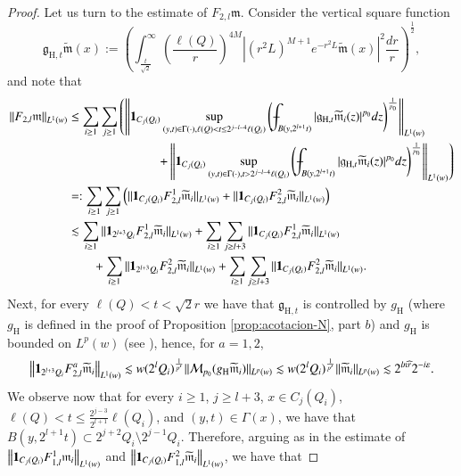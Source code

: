\documentclass[11pt, a4paper,leqno]{amsart}
\newcommand{\mm}{\mathfrak{m}}
\def\Xint#1{\mathchoice
    {\XXint\displaystyle\textstyle{#1}}%
    {\XXint\textstyle\scriptstyle{#1}}%
    {\XXint\scriptstyle\scriptscriptstyle{#1}}%
    {\XXint\scriptscriptstyle\scriptscriptstyle{#1}}%
    \!\int}
\def\XXint#1#2#3{{\setbox0=\hbox{$#1{#2#3}{\int}$}
    \vcenter{\hbox{$#2#3$}}\kern-.5\wd0}}
\def\dashint{\Xint-}
\def\Xint#1{\mathchoice
    {\XXint\displaystyle\textstyle{#1}}%
    {\XXint\textstyle\scriptstyle{#1}}%
    {\XXint\scriptstyle\scriptscriptstyle{#1}}%
    {\XXint\scriptscriptstyle\scriptscriptstyle{#1}}%
    \!\int}
\def\XXint#1#2#3{{\setbox0=\hbox{$#1{#2#3}{\int}$}
    \vcenter{\hbox{$#2#3$}}\kern-.5\wd0}}
\renewcommand{\chi}{{\bf 1}}
\theoremstyle{plain}
\theoremstyle{definition}
\theoremstyle{remark}
\numberwithin{equation}{section}
\def \hh{ \mathrm{H} }
\begin{document}
\begin{proof}
Let us turn to the estimate of $F_{2,l}\mm$.
Consider the vertical square function
$$
\mathfrak{g}_{\hh,t}\widetilde{\mm}(x):=\left(\int_{\frac{t}{\sqrt{2}}}^{\infty}\left(\frac{\ell(Q)}{r}\right)^{4M}|(r^2L)^{M+1}e^{-r^2L}\widetilde{\mm}(x)|^2\frac{dr}{r}\right)^{\frac{1}{2}},
$$
and note that
\begin{align}\label{F2lP}
\|F_{2,l}\mm\|_{L^1(w)}&\leq \sum_{i\geq 1}\sum_{j\geq 1}\left(\left\|\chi_{C_j(Q_i)}\sup_{(y,t)\in \Gamma(\cdot),\ell(Q)<t\leq 2^{j-l-4}\ell(Q_i)}\left(\dashint_{B(y,2^{l+1}t)}|\mathfrak{g}_{\hh,t}\widetilde{\mm}_i(z)|^{p_0}dz\right)^{\frac{1}{p_0}}\right\|_{L^1(w)}
\right.
\\\nonumber&\hspace*{2.5cm}
\left. +
\left\|\chi_{C_j(Q_i)}\sup_{(y,t)\in \Gamma(\cdot),t>2^{j-l-4}\ell(Q_i)}\left(\dashint_{B(y,2^{l+1}t)}|\mathfrak{g}_{\hh,t}\widetilde{\mm}_i(z)|^{p_0}dz\right)^{\frac{1}{p_0}}\right\|_{L^{1}(w)}\right)
\\\nonumber&
=:\sum_{i\geq 1}\sum_{j\geq 1}\left(\|\chi_{C_j(Q_i)}F_{2,l}^1\widetilde{\mm}_i\|_{L^1(w)}+\|\chi_{C_j(Q_i)}F_{2,l}^2\widetilde{\mm}_i\|_{L^1(w)}\right)
\\&\nonumber
\lesssim
\sum_{i\geq 1}\|\chi_{2^{l+3}Q_i}F_{2,l}^1\widetilde{\mm}_i\|_{L^1(w)}+\sum_{i\geq 1}\sum_{j\geq l+3}\|\chi_{C_j(Q_i)}F_{2,l}^1\widetilde{\mm}_i\|_{L^1(w)}
\\\nonumber&\qquad
+
\sum_{i\geq 1}
\|\chi_{2^{l+3}Q_i}F_{2,l}^2\widetilde{\mm}_i\|_{L^1(w)}
+
\sum_{i\geq 1}\sum_{j\geq l+3}\|\chi_{C_j(Q_i)}F_{2,l}^2\widetilde{\mm}_i\|_{L^1(w)}
.
\end{align}
Next, for every  $
\ell(Q)<t<\sqrt{2}r$ we have that $\mathfrak{g}_{\hh,t}$ is controlled by $g_{\hh}$ (where $g_{\hh}$ is defined in the proof of Proposition \ref{prop:acotacion-N}, part $b$) and $g_{\hh}$ is bounded on $L^p(w)$ (see \cite{AuscherMartell:III}), hence, for $a=1,2$, 
\begin{align*}
\left\|\chi_{2^{l+3}Q_i}F_{2,l}^a\widetilde{\mm}_i\right\|_{L^1(w)}
\lesssim
 w(2^{l}Q_i)^{\frac{1}{p'}}\|\mathcal{M}_{p_0}({g}_{\hh}\widetilde{\mm}_i)\|_{L^p(w)}
\lesssim w(2^{l}Q_i)^{\frac{1}{p'}}\|\widetilde{\mm}_i\|_{L^p(w)}\lesssim 2^{ln\widehat{r}}2^{-i\varepsilon}.
\end{align*}
We observe now that for every $i\geq 1$, $j\geq l+3$, $x\in C_j(Q_i)$, $\ell(Q)<t\leq \frac{2^{j-3}}{2^{l+1}}\ell(Q_i)$, and $(y,t)\in \Gamma(x)$, we have that
$B(y,2^{l+1}t)\subset 2^{j+2}Q_i\setminus 2^{j-1}Q_i$. Therefore, arguing as in the estimate of $\left\|\chi_{C_j(Q_i)}F_{1,l}^1{\mm}_i\right\|_{L^1(w)}$ and $\left\|\chi_{C_j(Q_i)}F_{1,l}^2\widetilde{\mm}_i\right\|_{L^1(w)}$, we have that

\end{proof}
\end{document}
